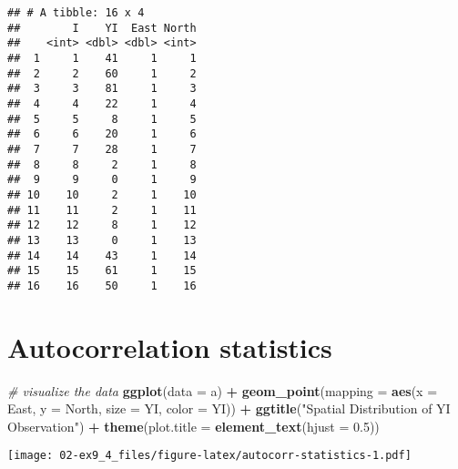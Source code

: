 \documentclass[]{book}
\newenvironment{Shaded}{\begin{snugshade}}{\end{snugshade}}
\newcommand{\CommentTok}[1]{\textcolor[rgb]{0.56,0.35,0.01}{\textit{#1}}}
\newcommand{\DataTypeTok}[1]{\textcolor[rgb]{0.13,0.29,0.53}{#1}}
\newcommand{\FloatTok}[1]{\textcolor[rgb]{0.00,0.00,0.81}{#1}}
\newcommand{\KeywordTok}[1]{\textcolor[rgb]{0.13,0.29,0.53}{\textbf{#1}}}
\newcommand{\NormalTok}[1]{#1}
\newcommand{\OperatorTok}[1]{\textcolor[rgb]{0.81,0.36,0.00}{\textbf{#1}}}
\newcommand{\StringTok}[1]{\textcolor[rgb]{0.31,0.60,0.02}{#1}}
\begin{document}
\begin{verbatim}
## # A tibble: 16 x 4
##        I    YI  East North
##    <int> <dbl> <dbl> <int>
##  1     1    41     1     1
##  2     2    60     1     2
##  3     3    81     1     3
##  4     4    22     1     4
##  5     5     8     1     5
##  6     6    20     1     6
##  7     7    28     1     7
##  8     8     2     1     8
##  9     9     0     1     9
## 10    10     2     1    10
## 11    11     2     1    11
## 12    12     8     1    12
## 13    13     0     1    13
## 14    14    43     1    14
## 15    15    61     1    15
## 16    16    50     1    16
\end{verbatim}

\hypertarget{autocorrelation-statistics}{%
\section{Autocorrelation statistics}\label{autocorrelation-statistics}}

\begin{Shaded}
\begin{Highlighting}[]
\CommentTok{# visualize the data}
\KeywordTok{ggplot}\NormalTok{(}\DataTypeTok{data =}\NormalTok{ a) }\OperatorTok{+}
\StringTok{  }\KeywordTok{geom_point}\NormalTok{(}\DataTypeTok{mapping =} \KeywordTok{aes}\NormalTok{(}\DataTypeTok{x =}\NormalTok{ East, }\DataTypeTok{y =}\NormalTok{ North, }\DataTypeTok{size =}\NormalTok{ YI, }\DataTypeTok{color =}\NormalTok{ YI)) }\OperatorTok{+}
\StringTok{  }\KeywordTok{ggtitle}\NormalTok{(}\StringTok{"Spatial Distribution of YI Observation"}\NormalTok{) }\OperatorTok{+}
\StringTok{  }\KeywordTok{theme}\NormalTok{(}\DataTypeTok{plot.title =} \KeywordTok{element_text}\NormalTok{(}\DataTypeTok{hjust =} \FloatTok{0.5}\NormalTok{))}
\end{Highlighting}
\end{Shaded}

\texttt{[image: 02-ex9\_4\_files/figure-latex/autocorr-statistics-1.pdf]}
\end{document}
